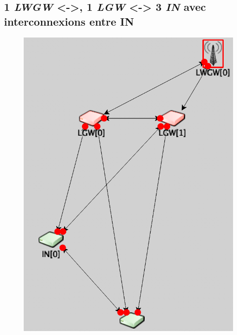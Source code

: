 \documentclass[a4paper]{article}
\begin{document}
\subsection{ 1 \textit{LWGW} <->, 1 \textit{LGW} <-> 3 \textit{IN} avec interconnexions entre IN}
\begin{figure}[h!]
\centering
\includegraphics[scale=0.5]{cas_1_1.png} 
\end{figure}
\end{document}
